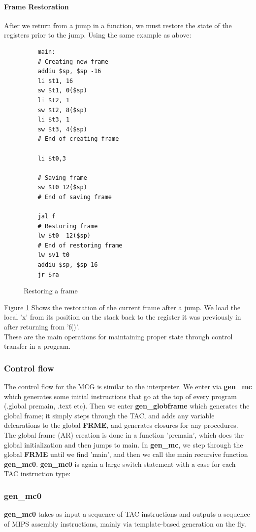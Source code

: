 \documentclass[12pt]{article}
\begin{document}
\paragraph{Frame Restoration} After we return from a jump in a function, we must restore the state of the registers prior to the jump. Using the same example as above: 
\begin{figure}[H]
  \begin{verbatim}
    main:
    # Creating new frame
    addiu $sp, $sp -16
    li $t1, 16
    sw $t1, 0($sp)
    li $t2, 1
    sw $t2, 8($sp)
    li $t3, 1
    sw $t3, 4($sp)
    # End of creating frame

    li $t0,3

    # Saving frame
    sw $t0 12($sp)
    # End of saving frame

    jal f
    # Restoring frame
    lw $t0  12($sp)
    # End of restoring frame
    lw $v1 t0
    addiu $sp, $sp 16
    jr $ra
  \end{verbatim}
  \caption{Restoring a frame}
  \label{rstfrme}
\end{figure}
Figure \ref{rstfrme} Shows the restoration of the current frame after a jump. We load the local 'x' from its position on the stack back to the register it was previously in after returning from 'f()'. \\\newline
These are the main operations for maintaining proper state through control transfer in a program.
\subsubsection{Control flow}
The control flow for the MCG is similar to the interpreter. We enter via \textbf{gen\_mc} which generates some initial instructions that go at the top of every program (.global premain, .text etc). Then we enter \textbf{gen\_globframe} which generates the global frame; it simply steps through the TAC, and adds any variable delcarations to the global \textbf{FRME}, and generates closures for any procedures. The global frame (AR) creation is done in a function 'premain', which does the global initialization and then jumps to main. In \textbf{gen\_mc}, we step through the global \textbf{FRME} until we find 'main', and then we call the main recursive function \textbf{gen\_mc0}.  \textbf{gen\_mc0} is again a large switch statement with a case for each TAC instruction type: 
\subsubsection{gen\_mc0}
\textbf{gen\_mc0} takes as input a sequence of TAC instructions and outputs a sequence of MIPS assembly instructions, mainly via template-based generation on the fly. 
\end{document}
